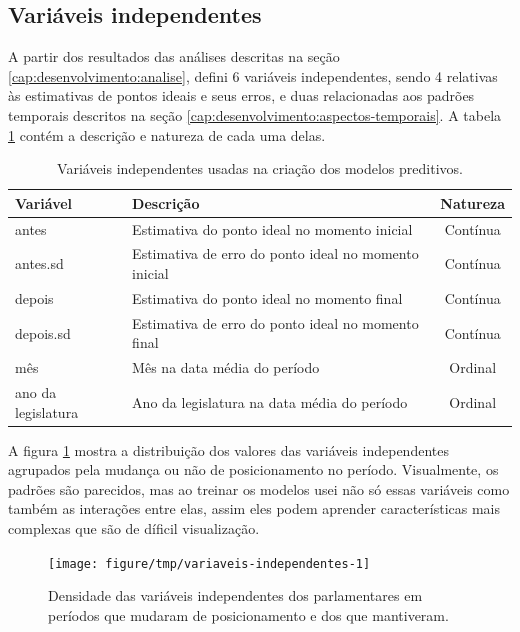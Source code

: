 \documentclass[a4paper,titlepage]{ppgi}\usepackage[]{graphicx}\usepackage[]{color}
\newenvironment{knitrout}{}{} %
\begin{document}
\subsection{Variáveis independentes}
\label{cap:desenvolvimento:variaveis-independentes}

A partir dos resultados das análises descritas na seção
\ref{cap:desenvolvimento:analise}, defini 6 variáveis independentes, sendo 4 relativas
às estimativas de pontos ideais e seus erros, e duas relacionadas aos padrões
temporais descritos na seção \ref{cap:desenvolvimento:aspectos-temporais}. A tabela
\ref{table:variaveis-independentes} contém a descrição e natureza de cada uma
delas.

\begin{table}
\centering
\begin{tabular}{l l c}
  Variável & Descrição & Natureza \\
  \hline
  antes & Estimativa do ponto ideal no momento inicial & Contínua \\
  antes.sd & Estimativa de erro do ponto ideal no momento inicial& Contínua \\
  depois & Estimativa do ponto ideal no momento final & Contínua \\
  depois.sd & Estimativa de erro do ponto ideal no momento final & Contínua \\
  mês & Mês na data média do período & Ordinal \\
  ano da legislatura & Ano da legislatura na data média do período & Ordinal \\
\end{tabular}
\caption{Variáveis independentes usadas na criação dos modelos preditivos.}
\label{table:variaveis-independentes}
\end{table}

A figura \ref{fig:variaveis-independentes} mostra a distribuição dos valores das
variáveis independentes agrupados pela mudança ou não de posicionamento no
período. Visualmente, os padrões são parecidos, mas ao treinar os modelos usei
não só essas variáveis como também as interações entre elas, assim eles podem
aprender características mais complexas que são de díficil visualização.

\begin{knitrout}
\color{fgcolor}\begin{figure}
\texttt{[image: figure/tmp/variaveis-independentes-1]} \caption[Densidade das variáveis independentes dos parlamentares em períodos que mudaram de posicionamento e dos que mantiveram]{Densidade das variáveis independentes dos parlamentares em períodos que mudaram de posicionamento e dos que mantiveram.}\label{fig:variaveis-independentes}
\end{figure}


\end{knitrout}
\end{document}
